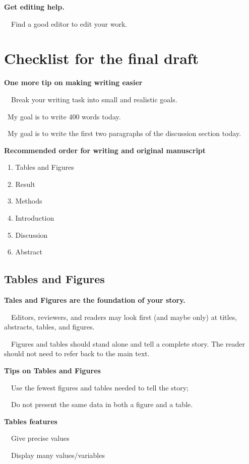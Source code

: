 \documentclass[a4paper, 12pt]{article}
\begin{document}
\textbf{Get editing help.}
\par\ \textbullet\ Find a good editor to edit your work.

\newpage\quad

\newpage\section{Checklist for the final draft}

\textbf{One more tip on making writing easier}
\par\ \textbullet\ Break your writing task into small and realistic goals.
\par\quad\textopenbullet\ My goal is to write 400 words today.
\par\quad\textopenbullet\ My goal is to write the first two paragraphs of the discussion section today.

\textbf{Recommended order for writing and original manuscript}
\par\ 1. Tables and Figures
\par\ 2. Result
\par\ 3. Methods
\par\ 4. Introduction
\par\ 5. Discussion
\par\ 6. Abstract

\subsection{Tables and Figures}

\textbf{Tales and Figures are the foundation of your story.}
\par\ \textbullet\ Editors, reviewers, and readers may look first (and maybe only) at titles, abstracts, tables, and figures.
\par\ \textbullet\ Figures and tables should stand alone and tell a complete story. The reader should not need to refer back to the main text.

\textbf{Tips on Tables and Figures}
\par\ \textbullet\ Use the fewest figures and tables needed to tell the story;
\par\ \textbullet\ Do not present the same data in both a figure and a table.

\newpage\textbf{Tables features}
\par\ \textbullet\ Give precise values
\par\ \textbullet\ Display many values/variables
\end{document}
